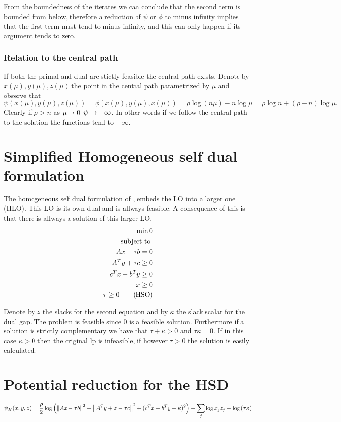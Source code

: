 \documentclass{article}
\begin{document}
    From the boundedness of the iterates we can conclude that the second term is bounded from below,
    therefore a reduction of $\psi$ or $\phi$ to minus infinity implies that the 
    first term must tend to minus infinity, and this can only happen if its argument tends to zero.

\subsubsection{Relation to the central path}
    If both the primal and dual are stictly feasible the central path exists. 
    Denote by $x(\mu),y(\mu),z(\mu)$ the point in the central path parametrized by $\mu$ and 
    observe that 
    \[
    \psi(x(\mu),y(\mu),z(\mu)) = \phi(x(\mu),y(\mu),x(\mu)) = \rho\log(n\mu) - n\log\mu = \rho\log n + (\rho-n)\log \mu. 
    \]
    Clearly if $\rho >n$ as $\mu\rightarrow0$ $\psi \rightarrow-\infty$.
    In other words if we follow the central path to the solution the functions tend 
    to $-\infty$.

\section{Simplified Homogeneous self dual formulation} 

The homogeneous self dual formulation of \cite{SimplifiedHSDYe}, embeds the LO into a larger one (HLO).
This LO is its own dual and is allways feasible. A consequence of this is that there is allways a solution of 
this larger LO. 
\begin{align}
  \min 0 \\
  \text{ subject to } \\
  Ax - \tau b = 0\\
  -A^Ty +\tau c \geq 0\\
  c^Tx-b^Ty \geq 0\\
  x\geq 0\\
  \tau \geq 0
  \tag{HSO}
  \label{eq:hsd}
\end{align}

Denote by $z$ the slacks for the second equation and by $\kappa$ the slack scalar for the dual gap.
The problem is feasible since $0$ is a feasible solution. Furthermore if a solution is strictly complementary
we have that $\tau + \kappa >0$ and $\tau \kappa = 0$. If in this case $\kappa >0$ then the original lp
is infeasible, if however $\tau>0$ the solution is easily calculated.

\section{Potential reduction for the HSD}
\begin{equation*}
  \psi_H(x,y,z) = \frac{\rho}{2}\log\left(\left\| Ax-\tau b \right\|^2+\left\| A^Ty+z-\tau c \right\|^2 + (c^Tx-b^Ty +\kappa)^2\right) -\sum_j\log{x_jz_j} - \log\left( \tau \kappa \right)
  \label{eq:psiH}
\end{equation*}
\end{document}

